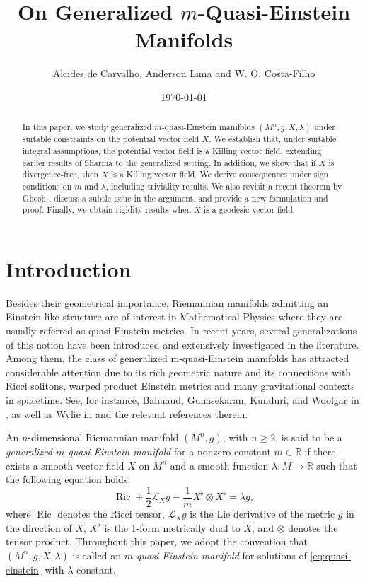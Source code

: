 \documentclass[a4paper, 12pt]{amsart}
\title[On Generalized $m$-Quasi-Einstein Manifolds]{On Generalized $m$-Quasi-Einstein Manifolds}
\author[Alcides de Carvalho, Anderson Lima and W. O. Costa-Filho]{Alcides de Carvalho, Anderson Lima and W. O. Costa-Filho}
\date{\today}
\theoremstyle{definition}
\numberwithin{figure}{section}
\begin{document}

\maketitle

\begin{abstract}
In this paper, we study generalized $m$-quasi-Einstein manifolds $(M^n,g,X,\lambda)$ under suitable constraints on the potential vector field $X$. We establish that, under suitable integral assumptions, the potential vector field is a Killing vector field, extending earlier results of Sharma \cite{Rsharma2025} to the generalized setting. In addition, we show that if $X$ is divergence-free, then $X$ is a Killing vector field. We derive consequences under sign conditions on $m$ and $\lambda$, including triviality results. We also revisit a recent theorem by Ghosh \cite{ghosh}, discuss a subtle issue in the argument, and provide a new formulation and proof. Finally, we obtain rigidity results when $X$ is a geodesic vector field.
\end{abstract}


\section{Introduction}

Besides their geometrical importance, Riemannian manifolds admitting an Einstein-like structure are of interest in Mathematical Physics where they are usually referred as quasi-Einstein metrics. In recent years, several generalizations of this notion have been introduced and extensively investigated in the literature. Among them, the class of generalized m-quasi-Einstein manifolds has attracted considerable attention due to its rich geometric nature and its connections with Ricci solitons, warped product Einstein metrics and many gravitational contexts in spacetime. See, for instance, Bahuaud, Gunasekaran, Kunduri, and Woolgar in \cite{Bahuaud2024}, as well as Wylie in \cite{Wylie2023} and the relevant references therein.

An $n$-dimensional Riemannian manifold $(M^n, g)$, with $n \geq 2$, is said to be a \emph{generalized $m$-quasi-Einstein manifold} for a nonzero constant $m \in \mathbb{R}$ if there exists a smooth vector field $X$ on $M^n$ and a smooth function $\lambda \colon M \to \mathbb{R}$ such that the following equation holds:
\begin{equation}\label{eq:quasi-einstein}
\operatorname{Ric} + \frac{1}{2} \mathcal{L}_X g - \frac{1}{m} X^\flat \otimes X^\flat = \lambda g,
\end{equation}
where $\operatorname{Ric}$ denotes the Ricci tensor, $\mathcal{L}_X g$ is the Lie derivative of the metric $g$ in the direction of $X$, $X^\flat$ is the 1-form metrically dual to $X$, and $\otimes$ denotes the tensor product. Throughout this paper, we adopt the convention that $(M^n,g,X,\lambda)$ is called an \emph{$m$-quasi-Einstein manifold} for solutions of \eqref{eq:quasi-einstein} with $\lambda$ constant.
\end{document}
